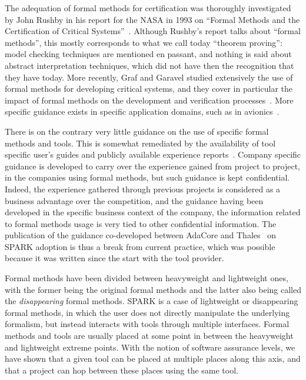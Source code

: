 \documentclass{llncs}
\begin{document}
The adequation of formal methods for certification was thoroughly investigated
by John Rushby in his report for the NASA in 1993 on ``Formal Methods and the
Certification of Critical Systems''~\cite{Rushby93formalmethods}. Although
Rushby's report talks about ``formal methods'', this mostly corresponds to what
we call today ``theorem proving'': model checking techniques are mentioned en
passant, and nothing is said about abstract interpretation techniques, which
did not have then the recognition that they have today. More recently, Graf and
Garavel studied extensively the use of formal methods for developing critical
systems, and they cover in particular the impact of formal methods on the
development and verification processes~\cite{GrafGaravel-BSI-2013}. More
specific guidance exists in specific application domains, such as in
avionics~\cite{BrownERTS2010}.

There is on the contrary very little guidance on the use of specific formal
methods and tools. This is somewhat remediated by the availability of tool
specific user's guides and publicly available experience
reports~\cite{Woodcock2009}. Company specific guidance is developed to carry
over the experience gained from project to project, in the companies using
formal methods, but such guidance is kept confidential. Indeed, the experience
gathered through previous projects is considered as a business advantage over
the competition, and the guidance having been developed in the specific
business context of the company, the information related to formal methods
usage is very tied to other confidential information. The publication of the
guidance co-developed between AdaCore and Thales~\cite{AdaCoreThalesSPARK} on
SPARK adoption is thus a break from current practice, which was possible
because it was written since the start with the tool provider.

Formal methods have been divided between heavyweight and lightweight ones, with
the former being the original formal methods and the latter also being called
the \textit{disappearing} formal methods. SPARK is a case of lightweight or
disappearing formal methods, in which the user does not directly manipulate the
underlying formalism, but instead interacts with tools through multiple
interfaces. Formal methods and tools are usually placed at some point in
between the heavyweight and lightweight extreme points. With the notion of
software assurance levels, we have shown that a given tool can be placed at
multiple places along this axis, and that a project can hop between these
places using the same tool.
\end{document}
